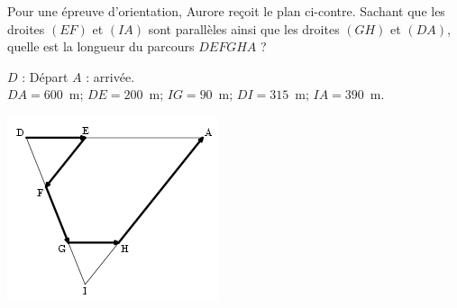 
\begin{multicols}{2}
Pour une épreuve d'orientation, Aurore reçoit
le plan ci-contre. Sachant que les droites $(EF)$ et $(IA)$ sont
parallèles ainsi que les droites $(GH)$ et $(DA)$, quelle est la
longueur du parcours $DEFGHA$ ?

\vspace{5mm}

$D$ : Départ\kern1cm $A$ : arrivée.\\
$DA=600$~m; $DE=200$~m; $IG=90$~m; $DI=315$~m; $IA=390$~m.

\includegraphics[scale=1]{TR-exo18.png} 

\end{multicols}